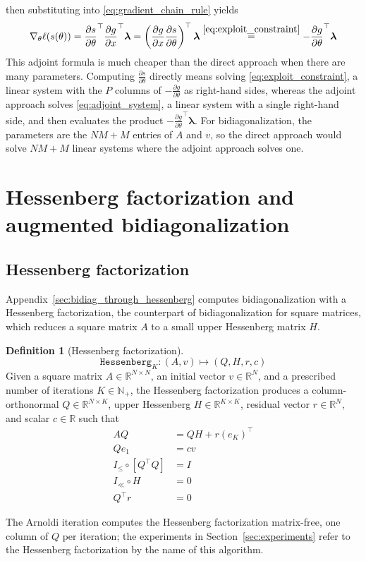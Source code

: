 \documentclass[a4paper,12pt]{article}
\theoremstyle{definition}
\newtheorem{definition}{Definition}
\begin{document}
then substituting into \eqref{eq:gradient_chain_rule} yields
\begin{align*}
    \nabla_\theta \ell(s(\theta)) = \frac{\partial s}{\partial \theta}^\top \frac{\partial g}{\partial x}^\top \boldsymbol{\lambda} = \left(\frac{\partial g}{\partial x} \frac{\partial s}{\partial \theta}\right)^\top \boldsymbol{\lambda} \overset{\eqref{eq:exploit_constraint}}{=} -\frac{\partial g}{\partial \theta}^\top \boldsymbol{\lambda}
\end{align*}
This adjoint formula is much cheaper than the direct approach when there are many parameters. Computing $\frac{\partial s}{\partial \theta}$ directly means solving \eqref{eq:exploit_constraint}, a linear system with the $P$ columns of $-\frac{\partial g}{\partial \theta}$ as right-hand sides, whereas the adjoint approach solves \eqref{eq:adjoint_system}, a linear system with a single right-hand side, and then evaluates the product $-\frac{\partial g}{\partial \theta}^\top \boldsymbol{\lambda}$. For bidiagonalization, the parameters are the $NM + M$ entries of $A$ and $v$, so the direct approach would solve $NM + M$ linear systems where the adjoint approach solves one.

\section{Hessenberg factorization and augmented bidiagonalization}\label{app:hessenberg}
\subsection{Hessenberg factorization}\label{app:hessenberg_def}
Appendix~\ref{sec:bidiag_through_hessenberg} computes bidiagonalization with a Hessenberg factorization, the counterpart of bidiagonalization for square matrices, which reduces a square matrix $A$ to a small upper Hessenberg matrix $H$.
\begin{definition}[Hessenberg factorization]\label{def:hessenberg}
$$\texttt{Hessenberg}_K: (A, v) \mapsto (Q, H, r, c)$$
Given a square matrix $A \in \mathbb{R}^{N \times N}$, an initial vector $v \in \mathbb{R}^N$, and a prescribed number of iterations $K \in \mathbb{N}_+$, the Hessenberg factorization produces a column-orthonormal $Q \in \mathbb{R}^{N \times K}$, 
upper Hessenberg $H \in \mathbb{R}^{K \times K}$, residual vector $r \in \mathbb{R}^N$, 
and scalar $c \in \mathbb{R}$ such that
\begin{align}
AQ &= QH + r(e_K)^\top \label{eq:hessenberg_forward_constraint1}
\\
Qe_1 &= cv \label{eq:hessenberg_forward_constraint2}
\\
I_{\leq} \circ [Q^\top Q] &= I \label{eq:hessenberg_forward_constraint3}
\\
I_{\ll} \circ H &= 0 \label{eq:hessenberg_forward_constraint4}
\\
Q^\top r &= 0 \label{eq:hessenberg_forward_constraint5}
\end{align}
\end{definition}
The Arnoldi iteration computes the Hessenberg factorization matrix-free, one column of $Q$ per iteration; the experiments in Section~\ref{sec:experiments} refer to the Hessenberg factorization by the name of this algorithm.
\end{document}
